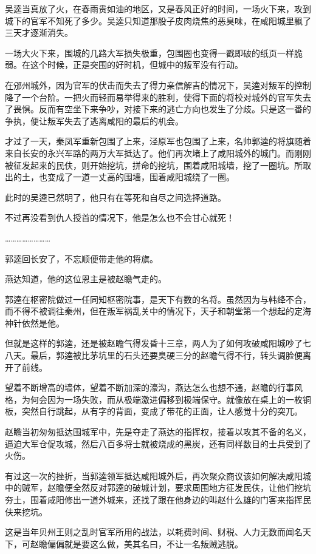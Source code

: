 吴逵当真放了火，在春雨贵如油的地区，又是春风正好的时间，一场火下来，攻到城下的官军不知死了多少。吴逵只知道那股子皮肉烧焦的恶臭味，在咸阳城里飘了三天才逐渐消失。

一场大火下来，围城的几路大军损失极重，包围圈也变得一戳即破的纸页一样脆弱。在这个时候，正是突围的好时机，但城中的叛军没有行动。

在邠州城外，因为官军的伏击而失去了得力亲信解吉的情况下，吴逵对叛军的控制降了一个台阶。一把火而轻而易举得来的胜利，使得下面的将校对城外的官军失去了畏惧。反而有空坐下来争吵，对接下来的逃亡方向也发生了分歧。只是这一番的争执，便让叛军失去了逃离咸阳的最后的机会。

才过了一天，秦凤军重新包围了上来，泾原军也包围了上来，名帅郭逵的将旗随着来自长安的永兴军路的两万大军抵达了。他们再次堵上了咸阳城外的城门。而刚刚被征发起来的民伕，则开始挖坑，拼命的挖坑，围着咸阳城墙，挖了一圈坑。所取出的土，也变成了一道一丈高的围墙，围着咸阳城绕了一圈。

此时的吴逵已然明了，他只有在等死和自尽之间选择道路。

不过再没看到仇人授首的情况下，他是怎么也不会甘心就死！

……………………

郭逵回长安了，不忘顺便带走他的将旗。

燕达知道，他的这位恩主是被赵瞻气走的。

郭逵在枢密院做过一任同知枢密院事，是天下有数的名将。虽然因为与韩绛不合，而不得不被调往秦州，但在叛军祸乱关中的情况下，天子和朝堂第一个想起的定海神针依然是他。

但就是这样的郭逵，还是被赵瞻气得发昏十三章，两人为了如何攻破咸阳城吵了七八天。最后，郭逵被比茅坑里的石头还要臭硬三分的赵瞻气得不行，转头调脸便离开了前线。

望着不断增高的墙体，望着不断加深的濠沟，燕达怎么也想不通，赵瞻的行事风格，为何会因为一场失败，而从极端激进偏移到极端保守。就像放在桌上的一枚铜板，突然自行跳起，从有字的背面，变成了带花的正面，让人感觉十分的突兀。

赵瞻当初匆匆抵达围城军中，先是夺走了燕达的指挥权，接着以攻其不备的名义，逼迫大军仓促攻城，然后八百多将士就被烧成的黑炭，还有同样数目的士兵受到了火伤。

有过这一次的挫折，当郭逵领军抵达咸阳城外后，再次聚众商议该如何解决咸阳城中的贼军，赵瞻便全然反对郭逵的破城计划，要求周围地方征发民伕，让他们挖坑夯土，围着咸阳修出一道外城来，还找了跟在他身边的叫赵什么雄的门客来指挥民伕来挖坑。

这是当年贝州王则之乱时官军所用的战法，以耗费时间、财税、人力无数而闻名天下，可赵瞻偏偏就是要这么做，美其名曰，不让一名叛贼逃脱。

